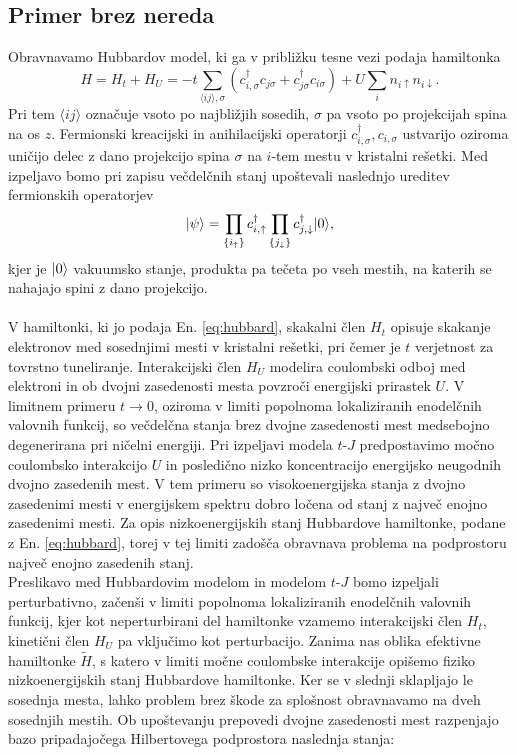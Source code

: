 \begin{appendices}
\section{Primer brez nereda}
Obravnavamo Hubbardov model, ki ga v približku tesne vezi podaja hamiltonka
\begin{equation}\label{eq:hubbard}
H=H_t + H_U=-t\sum\limits_{\langle ij \rangle, \sigma}\left(c^\dagger_{i,\sigma} c_{j\sigma} + c^\dagger_{j\sigma}c_{i\sigma}\right) + U\sum_i n_{i\uparrow}n_{i\downarrow}.
\end{equation}
Pri tem  $\langle ij \rangle$ označuje vsoto po najbližjih sosedih, $\sigma$ pa vsoto po projekcijah spina na os $z$. Fermionski kreacijski in anihilacijski operatorji $c^\dagger_{i,\sigma}, c_{i,\sigma}$ ustvarijo oziroma uničijo delec z dano projekcijo spina $\sigma$ na $i$-tem mestu v kristalni rešetki.  Med izpeljavo bomo pri zapisu večdelčnih stanj upoštevali naslednjo ureditev fermionskih operatorjev
$$
\vert\psi\rangle=\prod\limits_{\{i_\uparrow \}} c_{i, \uparrow}^\dagger \prod\limits_{\{j_\downarrow \}} c_{j, \downarrow}^\dagger \vert0\rangle,
$$
kjer je $\vert0\rangle$ vakuumsko stanje, produkta pa tečeta po vseh mestih, na katerih se nahajajo spini z dano projekcijo. \\\\
V hamiltonki, ki jo podaja En. \eqref{eq:hubbard}, skakalni člen $H_t$ opisuje skakanje elektronov med sosednjimi mesti v kristalni rešetki, pri čemer je $t$ verjetnost za tovrstno tuneliranje. Interakcijski člen $H_U$ modelira coulombski odboj med elektroni in ob dvojni zasedenosti mesta povzroči energijski prirastek $U$. V limitnem primeru $t\to 0$, oziroma v limiti popolnoma lokaliziranih enodelčnih valovnih funkcij, so večdelčna stanja brez dvojne zasedenosti mest medsebojno degenerirana pri ničelni energiji. Pri izpeljavi modela $t$-$J$ predpostavimo močno coulombsko interakcijo $U$ in posledično nizko koncentracijo energijsko neugodnih dvojno zasedenih mest. V tem primeru so visokoenergijska stanja z dvojno zasedenimi mesti v energijskem spektru dobro ločena od stanj z največ enojno zasedenimi mesti. Za opis nizkoenergijskih stanj Hubbardove hamiltonke, podane z En. \eqref{eq:hubbard}, torej v tej limiti zadošča obravnava problema na podprostoru največ enojno zasedenih stanj.  \\
Preslikavo med Hubbardovim modelom in modelom $t$-$J$ bomo izpeljali perturbativno, začenši v limiti popolnoma lokaliziranih enodelčnih valovnih funkcij, kjer kot neperturbirani del hamiltonke vzamemo interakcijski člen $H_t$, kinetični člen $H_U$ pa vključimo kot perturbacijo. Zanima nas oblika efektivne hamiltonke $\tilde{H}$, s katero v limiti močne coulombske interakcije opišemo fiziko nizkoenergijskih stanj Hubbardove hamiltonke. Ker se v slednji sklapljajo le sosednja mesta, lahko problem brez škode za splošnost obravnavamo na dveh sosednjih mestih. Ob upoštevanju prepovedi dvojne zasedenosti mest razpenjajo bazo pripadajočega Hilbertovega podprostora naslednja stanja:

\end{appendices}
